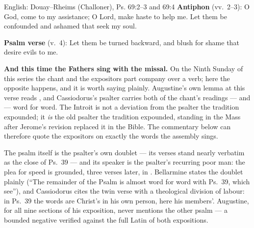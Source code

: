 \begin{namedtranslation}{English: Douay--Rheims (Challoner), Ps. 69:2--3 and 69:4}
\textbf{Antiphon} (vv.~2--3): O God, come to my assistance; O Lord, make haste
to help me. Let them be confounded and ashamed that seek my soul.

\textbf{Psalm verse} (v.~4): Let them be turned backward, and blush for shame
that desire evils to me.
\end{namedtranslation}


\textbf{And this time the Fathers sing with the missal.} On the Ninth Sunday
of this series the chant and the expositors part company over a verb; here
the opposite happens, and it is worth saying plainly. Augustine's own lemma at
this verse reads , and Cassiodorus's psalter carries both of the chant's readings ---
 and  --- word for word. The Introit is not
a deviation from the psalter the tradition expounded; it \textit{is} the old
psalter the tradition expounded, standing in the Mass after Jerome's revision
replaced it in the Bible. The commentary below can therefore quote the
expositors on exactly the words the assembly sings.

The psalm itself is the psalter's own doublet --- its verses stand nearly
verbatim as the close of Ps.~39 --- and its speaker is the psalter's
recurring poor man: the plea for speed is grounded, three verses later, in
. Bellarmine states the doublet plainly
(``The remainder of the Psalm is almost word for word with Ps.~39, which
see''), and Cassiodorus cites the twin verse with a theological division of
labour: in Ps.~39 the words are Christ's in his own person, here his
members'. Augustine, for all nine sections of his exposition, never mentions
the other psalm --- a bounded negative verified against the full Latin of
both expositions.

